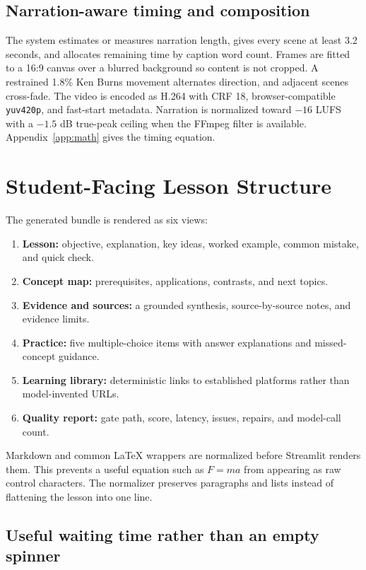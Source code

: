 \documentclass[11pt]{article}
\newcommand{\code}[1]{\texttt{#1}}
\theoremstyle{plain}
\theoremstyle{definition}
\begin{document}
\subsection{Narration-aware timing and composition}

The system estimates or measures narration length, gives every scene at least 3.2 seconds, and allocates remaining time by caption word count. Frames are fitted to a 16:9 canvas over a blurred background so content is not cropped. A restrained 1.8\% Ken Burns movement alternates direction, and adjacent scenes cross-fade. The video is encoded as H.264 with CRF 18, browser-compatible \code{yuv420p}, and fast-start metadata. Narration is normalized toward $-16$ LUFS with a $-1.5$ dB true-peak ceiling when the FFmpeg filter is available. Appendix~\ref{app:math} gives the timing equation.

\section{Student-Facing Lesson Structure}

The generated bundle is rendered as six views:
\begin{enumerate}
  \item \textbf{Lesson:} objective, explanation, key ideas, worked example, common mistake, and quick check.
  \item \textbf{Concept map:} prerequisites, applications, contrasts, and next topics.
  \item \textbf{Evidence and sources:} a grounded synthesis, source-by-source notes, and evidence limits.
  \item \textbf{Practice:} five multiple-choice items with answer explanations and missed-concept guidance.
  \item \textbf{Learning library:} deterministic links to established platforms rather than model-invented URLs.
  \item \textbf{Quality report:} gate path, score, latency, issues, repairs, and model-call count.
\end{enumerate}

Markdown and common LaTeX wrappers are normalized before Streamlit renders them. This prevents a useful equation such as $F=ma$ from appearing as raw control characters. The normalizer preserves paragraphs and lists instead of flattening the lesson into one line.

\subsection{Useful waiting time rather than an empty spinner}
\end{document}
